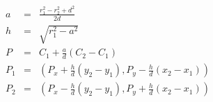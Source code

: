 \documentclass[12pt]{article}
\begin{document}
\[
    \begin{array}{rcl}
        a &=& \frac{r_1^2 - r_2^2 + d^2}{2d}\\
        h &=& \sqrt{r_1^2 - a^2} \\
        P &=& C_1 + \frac{a}{d}(C_2 - C_1) \\
        P_1 &=& (P_x + \frac{h}{d}(y_2 - y_1), P_y - \frac{h}{d}(x_2 - x_1)) \\
        P_2 &=& (P_x - \frac{h}{d}(y_2 - y_1), P_y + \frac{h}{d}(x_2 - x_1)) \\
    \end{array}
\]
\end{document}
